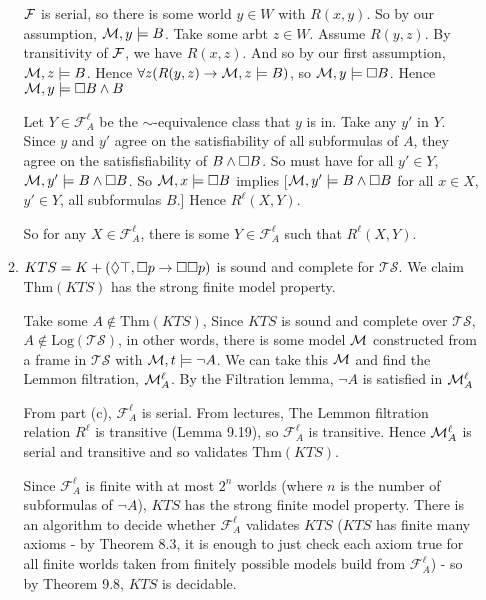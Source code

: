 \documentclass[a4paper, draft, 12pt]{article}
\begin{document}
\begin{enumerate}
\begin{enumerate}
  $\mathcal{F}$ is serial, so there 
  is some world $y \in W$ with $R(x,y)$. So by our assumption, $\mathcal{M}, y \models B$.
  Take some arbt $z \in W$. Assume $R(y,z)$. By transitivity of $\mathcal{F}$, we have $R(x,z)$. 
  And so by our first assumption, $\mathcal{M}, z \models B$.
  Hence $\forall z(R(y,z) \rightarrow \mathcal{M}, z \models B)$, so $\mathcal{M}, y \models \square B$. 
  Hence $\mathcal{M}, y \models \square B \wedge B$

  Let $Y\in \mathcal{F}^{\ell}_{A}$ be the $\sim$-equivalence class that $y$ is in.
  Take any $y'$ in $Y$. Since $y$ and $y'$ agree on the satisfiability of all subformulas of $A$, 
  they agree on the satisfisfiability of $B \wedge \square B$.
  So must have for all $y' \in Y$, $\mathcal{M}, y' \models B \wedge \square B$. 
  So $\mathcal{M}, x \models \square B$ implies [$\mathcal{M}, y' \models B \wedge \square B$ for all $x \in X$, $y' \in Y$, all subformulas $B$.]
  Hence $R^{\ell}(X,Y)$. 

  So for any $X\in \mathcal{F}^{\ell}_{A}$, there is some $Y\in \mathcal{F}^{\ell}_{A}$ 
  such that $R^{\ell}(X,Y)$.
  \item %
  $KTS = K + (\Diamond \top, \square p \rightarrow \square \square p)$ is sound and complete for $\mathcal{TS}$.
  We claim $\text{Thm}(KTS)$ has the strong finite model property. 

  Take some $A \notin \text{Thm}(KTS)$,
  Since $KTS$ is sound and complete over $\mathcal{TS}$, 
  $A \notin \text{Log}(\mathcal{TS})$, in other words, there is some 
  model $\mathcal{M}$ constructed from a frame in $\mathcal{TS}$ with $\mathcal{M},t \models \neg A$.
  We can take this $\mathcal{M}$ and find the Lemmon filtration, $\mathcal{M}^{\ell}_{A}$.
  By the Filtration lemma, $\neg A$ is satisfied in $\mathcal{M}^{\ell}_{A}$

  From part (c), $\mathcal{F}^{\ell}_{A}$ is serial. From lectures,
  The Lemmon filtration relation $R^\ell$ is transitive (Lemma 9.19), so
  $\mathcal{F}^{\ell}_{A}$ is transitive. Hence $\mathcal{M}^{\ell}_{A}$ is 
  serial and transitive and so validates $\text{Thm}(KTS)$.

  Since $\mathcal{F}^{\ell}_{A}$ is finite with at most $2^n$ worlds (where $n$ is the 
  number of subformulas of $\neg A$), $KTS$ has the strong finite model property.
  There is an algorithm to decide whether $\mathcal{F}^{\ell}_{A}$ validates 
  $KTS$ ($KTS$ has finite many axioms - by Theorem 8.3, it is enough to just check each axiom true for all finite worlds
  taken from finitely possible models build from $\mathcal{F}^{\ell}_{A}$) - so by Theorem 9.8, $KTS$ is decidable. 


\end{enumerate}
\end{enumerate}
\end{document}
